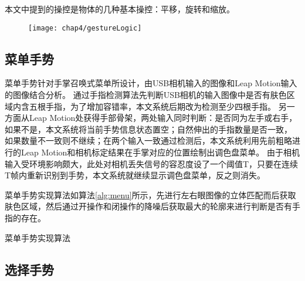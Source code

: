 本文中提到的操控是物体的几种基本操控：平移，旋转和缩放。

\begin{figure}[!htp]
  \centering
  \texttt{[image: chap4/gestureLogic]}
\end{figure}

\subsection{菜单手势}

菜单手势针对手掌召唤式菜单所设计，由USB相机输入的图像和Leap Motion输入的图像结合分析。
通过手指检测算法先判断USB相机的输入图像中是否有肤色区域内含五根手指，为了增加容错率，本文系统后期改为检测至少四根手指。
另一方面从Leap Motion处获得手部骨架，两处输入同时判断：是否同为左手或右手，如果不是，本文系统将当前手势信息状态置空；自然伸出的手指数量是否一致，
如果数量不一致则不继续；在两个输入一致通过检测后，本文系统利用先前粗略进行的Leap Motion和相机标定结果在手掌对应的位置绘制出调色盘菜单。
由于相机输入受环境影响颇大，此处对相机丢失信号的容忍度设了一个阈值T，只要在连续T帧内重新识别到手势，本文系统就继续显示调色盘菜单，反之则消失。

菜单手势实现算法如算法\ref{alg:menu}所示，先进行左右眼图像的立体匹配而后获取肤色区域，然后通过开操作和闭操作的降噪后获取最大的轮廓来进行判断是否有手指的存在。
	\begin{algorithm}  
		\caption{菜单手势实现算法}  
		\label{alg:menu} 
		\begin{algorithmic}  
				\ENDFOR
				\ENDIF
			\ENDFOR			
		\end{algorithmic}  
	\end{algorithm} 
\subsection{选择手势}

